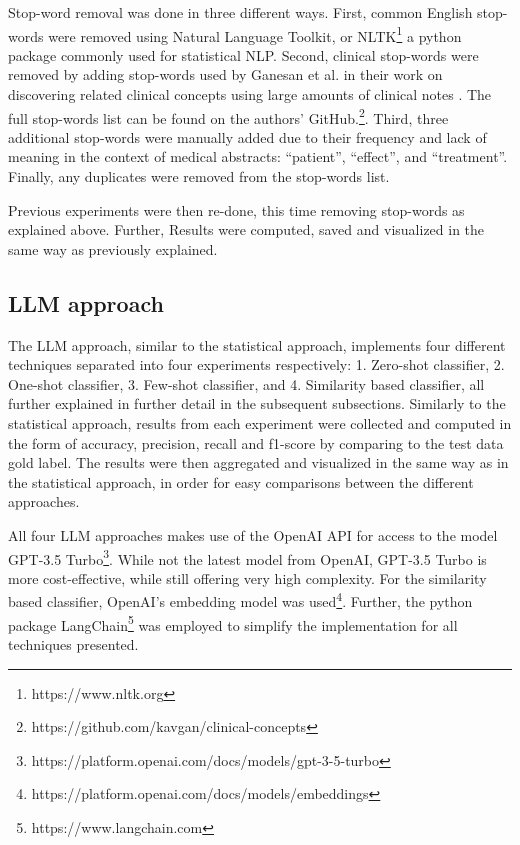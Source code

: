 Stop-word removal was done in three different ways. First, common English stop-words were removed using Natural Language Toolkit, or NLTK\footnote{https://www.nltk.org} a python package commonly used for statistical NLP. Second, clinical stop-words were removed by adding stop-words used by Ganesan et al. in their work on discovering related clinical concepts using large amounts of clinical notes \cite{Ganesan2016DiscoveringNotes}. The full stop-words list can be found on the authors' GitHub.\footnote{https://github.com/kavgan/clinical-concepts}. Third, three additional stop-words were manually added due to their frequency and lack of meaning in the context of medical abstracts: “patient”, “effect”, and “treatment”. Finally, any duplicates were removed from the stop-words list.

Previous experiments were then re-done, this time removing stop-words as explained above. Further, Results were computed, saved and visualized in the same way as previously explained.

\subsection{LLM approach}
\label{subsec:method-llm-approach}

The LLM approach, similar to the statistical approach, implements four different techniques separated into four experiments respectively: 1. Zero-shot classifier, 2. One-shot classifier, 3. Few-shot classifier, and 4. Similarity based classifier, all further explained in further detail in the subsequent subsections. Similarly to the statistical approach, results from each experiment were collected and computed in the form of accuracy, precision, recall and f1-score by comparing to the test data gold label. The results were then aggregated and visualized in the same way as in the statistical approach, in order for easy comparisons between the different approaches.

All four LLM approaches makes use of the OpenAI API for access to the model GPT-3.5 Turbo\footnote{https://platform.openai.com/docs/models/gpt-3-5-turbo}. While not the latest model from OpenAI, GPT-3.5 Turbo is more cost-effective, while still offering very high complexity. For the similarity based classifier, OpenAI's embedding model was used\footnote{https://platform.openai.com/docs/models/embeddings}. Further, the python package LangChain\footnote{https://www.langchain.com} was employed to simplify the implementation for all techniques presented.

